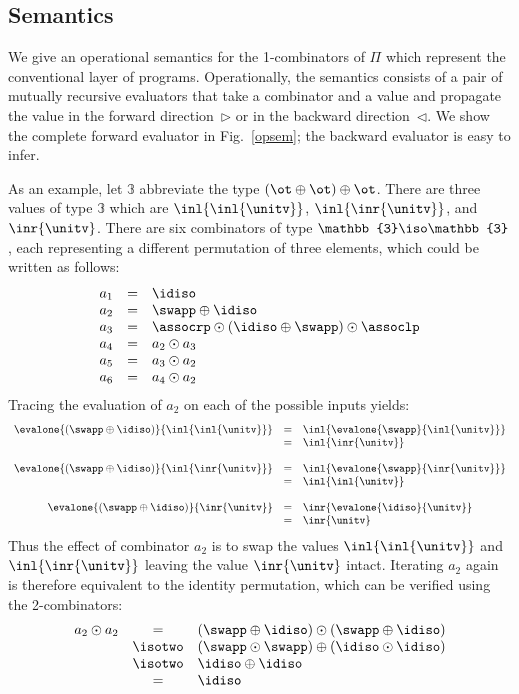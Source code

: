 \subsection{Semantics}
\label{sec:pisem}

We give an operational semantics for the 1-combinators of $\Pi$ which
represent the conventional layer of programs.  Operationally, the
semantics consists of a pair of mutually recursive evaluators that
take a combinator and a value and propagate the value in the forward
direction~$\triangleright$ or in the backward
direction~$\triangleleft$. We show the complete forward evaluator in
Fig.~\ref{opsem}; the backward evaluator is easy to infer.

As an example, let $\mathbb{3}$ abbreviate the type
$(\ot \oplus \ot) \oplus \ot$. There are three values of type
$\mathbb{3}$ which are $\inl{\inl{\unitv}}$, $\inl{\inr{\unitv}}$, and
$\inr{\unitv}$. There are six combinators of type
$\mathbb{3} \iso \mathbb{3}$, each representing a different
permutation of three elements, which could be written as follows:
\[\begin{array}{rcl}
a_1 &=& \idiso \\
a_2 &=& \swapp \oplus \idiso \\
a_3 &=& \assocrp \odot (\idiso \oplus \swapp) \odot \assoclp \\
a_4 &=& a_2 \odot a_3 \\
a_5 &=& a_3 \odot a_2 \\
a_6 &=& a_4 \odot a_2
\end{array}\]
Tracing the evaluation of $a_2$ on each of the possible inputs yields:
\[\begin{array}{rcl}
\evalone{(\swapp\oplus\idiso)}{\inl{\inl{\unitv}}} &=& \inl{\evalone{\swapp}{\inl{\unitv}}} \\
&=& \inl{\inr{\unitv}} \\
\\
\evalone{(\swapp\oplus\idiso)}{\inl{\inr{\unitv}}} &=& \inl{\evalone{\swapp}{\inr{\unitv}}} \\
&=& \inl{\inl{\unitv}} \\
\\
\evalone{(\swapp\oplus\idiso)}{\inr{\unitv}} &=& \inr{\evalone{\idiso}{\unitv}} \\
&=& \inr{\unitv}
\end{array}\]
Thus the effect of combinator $a_2$ is to swap the values
$\inl{\inl{\unitv}}$ and $\inl{\inr{\unitv}}$ leaving the value
$\inr{\unitv}$ intact. Iterating $a_2$ again is therefore equivalent
to the identity permutation, which can be verified using the 
2-combinators:
\[\begin{array}{rcl}
a_2 \odot a_2 &=& (\swapp \oplus \idiso) \odot (\swapp \oplus \idiso) \\
&\isotwo& (\swapp \odot \swapp) \oplus (\idiso \odot \idiso) \\
&\isotwo& \idiso \oplus \idiso \\
&=& \idiso
\end{array}\]

